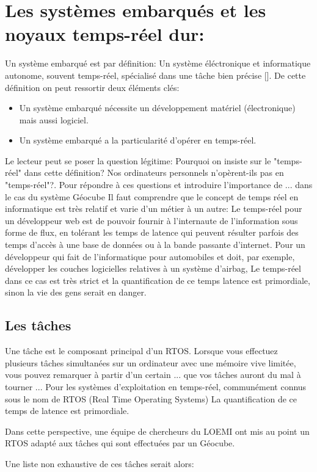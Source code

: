 \documentclass{themeensg}
\begin{document}
\section{Les systèmes embarqués et les noyaux temps-réel dur:}
Un système embarqué est par définition: Un système éléctronique et informatique autonome, souvent temps-réel, spécialisé dans une tâche bien précise []. De cette définition on peut ressortir deux éléments clés:
\begin{itemize}
\item Un système embarqué nécessite un développement matériel (électronique) mais aussi logiciel.
\item Un système embarqué a la particularité d'opérer en temps-réel.
\end{itemize}
Le lecteur peut se poser la question légitime: Pourquoi on insiste sur le "temps-réel" dans cette définition? Nos ordinateurs personnels n'opèrent-ils pas en "temps-réel"?. Pour répondre à ces questions et introduire l'importance de ... dans le cas du système Géocube Il faut comprendre que le concept de temps réel en informatique est très relatif et varie d'un métier à un autre: Le temps-réel pour un développeur web est de pouvoir fournir à l'internaute de l'information sous forme de flux, en tolérant les temps de latence qui peuvent résulter parfois des temps d'accès à une base de données ou à la bande passante d'internet. Pour un développeur qui fait de l'informatique pour automobiles et doit, par exemple, développer les couches logicielles relatives à un système d'airbag, Le temps-réel dans ce cas est très strict et la quantification de ce temps latence est primordiale, sinon la vie des gens serait en danger.
\subsection{Les tâches}
Une tâche est le composant principal d'un RTOS. Lorsque vous effectuez plusieurs tâches simultanées sur un ordinateur avec une mémoire vive limitée, vous pouvez remarquer à partir d'un certain ... que vos tâches auront du mal à tourner ... Pour les systèmes d'exploitation en temps-réel, communément connus sous le nom de RTOS (Real Time Operating Systems) La quantification de ce temps de latence est primordiale.

Dans cette perspective, une équipe de chercheurs du LOEMI ont mis au point un RTOS adapté aux tâches qui sont effectuées par un Géocube.

Une liste non exhaustive de ces tâches serait alors:
\end{document}

